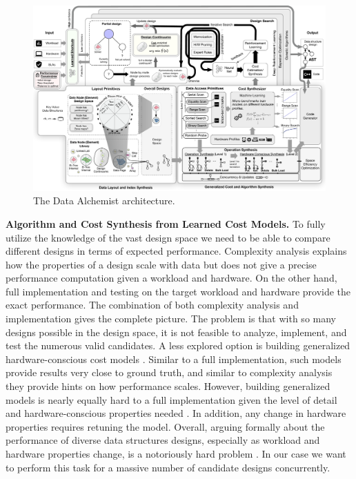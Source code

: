 \documentclass[11pt]{article}
\begin{document}
\begin{figure}[t]
    \center
  \includegraphics[width=\textwidth]{figs/Alchemy.pdf}
  \vspace{-6ex}
   \caption{The Data Alchemist architecture.}
   \vspace{-4ex}
   \label{fig:architecture}
\end{figure}

\textbf{Algorithm and Cost Synthesis from Learned Cost Models.}
To fully utilize the knowledge of the vast design space we need to be able to compare different designs in terms of expected performance. Complexity analysis explains how the properties of a design scale with data but does not give a precise performance computation given a workload and hardware. On the other hand, full implementation and testing on the target workload and hardware provide the exact performance. The combination of both complexity analysis and implementation gives the complete picture. The problem is that with so many designs possible in the design space, it is not feasible to analyze, implement, and test the numerous valid candidates. A less explored option is building generalized hardware-conscious cost models \cite{Manegold2002,Yao1977}. Similar to a full implementation, such models provide results very close to ground truth, and similar to complexity analysis they provide hints on how performance scales. However, building generalized models is nearly equally hard to a full implementation given the level of detail and hardware-conscious properties needed \cite{Kester2017}. In addition, any change in hardware properties requires retuning the model. Overall, arguing formally about the performance of diverse data structures designs, especially as workload and hardware properties change, is a notoriously hard problem \cite{Cardenas1973,Kester2017,Manegold2002,Teorey1976,Yao1977,Yao1975,Zhou1999}. In our case we want to perform this task for a massive number of candidate designs concurrently. 
\end{document}
